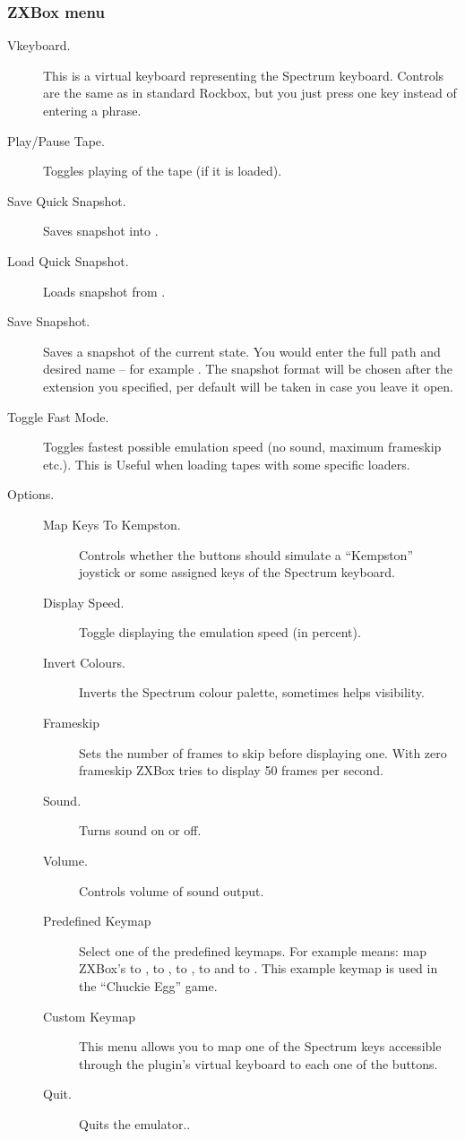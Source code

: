 \subsubsection{ZXBox menu}
\begin{description}
\item[ Vkeyboard.]
    This is a virtual keyboard representing the Spectrum keyboard. Controls are
    the same as in standard Rockbox, but you just press one key instead of
    entering a phrase.
\item[Play/Pause Tape.] Toggles playing of the tape (if it is loaded).
\item[Save Quick Snapshot.] Saves snapshot into .
\item[Load Quick Snapshot.] Loads snapshot from .
\item[Save Snapshot.]
    Saves a snapshot of the current state. You would enter the full path and
    desired name -- for example . The
    snapshot format will be chosen after the extension you specified, per
    default  will be taken in case you leave it open.
\item[Toggle Fast Mode.]
    Toggles fastest possible emulation speed (no sound, maximum frameskip etc.).
    This is Useful when loading tapes with some specific loaders.
\item[Options.]
    \begin{description}
    \item[Map Keys To Kempston.]
        Controls whether the \daps{} buttons should simulate a ``Kempston''
        joystick or some assigned keys of the Spectrum keyboard.
    \item[Display Speed.]Toggle displaying the emulation speed (in percent).
    \item[Invert Colours.]
        Inverts the Spectrum colour palette, sometimes helps visibility.
    \item[Frameskip]
        Sets the number of frames to skip before displaying one. With zero
        frameskip ZXBox tries to display 50 frames per second.
    \item[Sound.]Turns sound on or off.
    \item[Volume.]Controls volume of sound output.
    \item[Predefined Keymap]
        Select one of the predefined keymaps. For example  means:
        map ZXBox's  to ,  to ,
         to ,  to  and
         to . This example keymap is used in the
        ``Chuckie Egg'' game.
    \item[Custom Keymap]
        This menu allows you to map one of the Spectrum keys accessible through the 
        plugin's virtual keyboard to each one of the buttons.
    \item[Quit.] Quits the emulator..
    \end{description}
\end{description}

